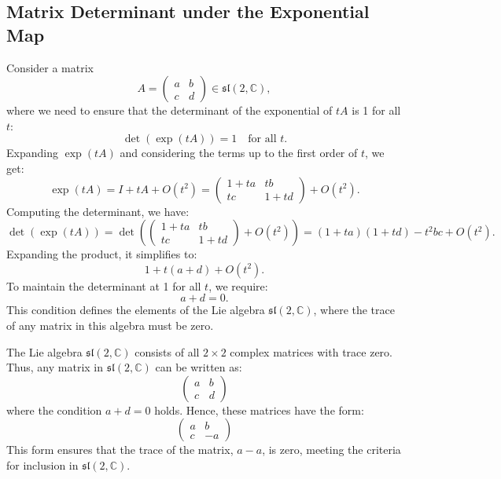 \documentclass{article}
\begin{document}
\subsection*{Matrix Determinant under the Exponential Map}
Consider a matrix 
\[
A = \begin{pmatrix} a & b \\ c & d \end{pmatrix} \in \mathfrak{sl}(2, \mathbb{C}),
\]
where we need to ensure that the determinant of the exponential of \(tA\) is 1 for all \(t\):
\[
\det(\exp(tA)) = 1 \quad \text{for all } t.
\]
Expanding \(\exp(tA)\) and considering the terms up to the first order of \(t\), we get:
\[
\exp(tA) = I + tA + O(t^2) = \begin{pmatrix} 1+ta & tb \\ tc & 1+td \end{pmatrix} + O(t^2).
\]
Computing the determinant, we have:
\[
\det(\exp(tA)) = \det \left(\begin{pmatrix} 1+ta & tb \\ tc & 1+td \end{pmatrix} + O(t^2)\right) = (1+ta)(1+td) - t^2bc + O(t^2).
\]
Expanding the product, it simplifies to:
\[
1 + t(a+d) + O(t^2).
\]
To maintain the determinant at 1 for all \(t\), we require:
\[
a + d = 0.
\]
This condition defines the elements of the Lie algebra \(\mathfrak{sl}(2, \mathbb{C})\), where the trace of any matrix in this algebra must be zero.

The Lie algebra \(\mathfrak{sl}(2, \mathbb{C})\) consists of all \(2 \times 2\) complex matrices with trace zero. Thus, any matrix in \(\mathfrak{sl}(2, \mathbb{C})\) can be written as:
\[
\begin{pmatrix} a & b \\ c & d \end{pmatrix}
\]
where the condition \(a + d = 0\) holds. Hence, these matrices have the form:
\[
\begin{pmatrix} a & b \\ c & -a \end{pmatrix}
\]
This form ensures that the trace of the matrix, \(a - a\), is zero, meeting the criteria for inclusion in \(\mathfrak{sl}(2, \mathbb{C})\).
\end{document}
